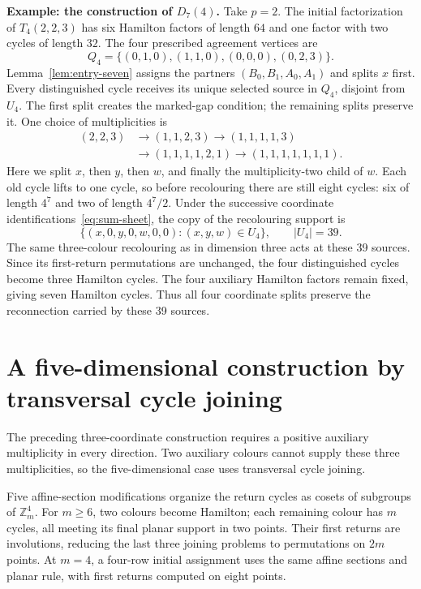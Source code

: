 \documentclass[11pt,reqno]{amsart}
\numberwithin{equation}{section}
\theoremstyle{definition}
\theoremstyle{remark}
\newcommand{\Zm}{\mathbb Z_m}
\begin{document}
\medskip
\noindent\textbf{Example: the construction of $D_7(4)$.}
Take $p=2$. The initial factorization of $T_4(2,2,3)$ has six Hamilton
factors of length $64$ and one factor with two cycles of length $32$.
The four prescribed agreement vertices are
\[
 Q_4=\{(0,1,0),(1,1,0),(0,0,0),(0,2,3)\}.
\]
Lemma~\ref{lem:entry-seven} assigns the partners $(B_0,B_1,A_0,A_1)$ and splits
$x$ first. Every distinguished cycle receives its unique selected source
in $Q_4$, disjoint from $U_4$. The first split creates the marked-gap
condition; the remaining splits preserve it. One choice of multiplicities is
\[
\begin{aligned}
 (2,2,3)&\longrightarrow(1,1,2,3)
          \longrightarrow(1,1,1,1,3)\\
        &\longrightarrow(1,1,1,1,2,1)
          \longrightarrow(1,1,1,1,1,1,1).
\end{aligned}
\]
Here we split $x$, then $y$, then $w$, and finally the multiplicity-two child
of $w$. Each old cycle lifts to one cycle, so before recolouring there are
still eight cycles: six of length $4^7$ and two of length $4^7/2$.
Under the successive coordinate identifications~\eqref{eq:sum-sheet}, the
copy of the recolouring support is
\[
 \{(x,0,y,0,w,0,0):(x,y,w)\in U_4\},\qquad |U_4|=39.
\]
The same three-colour recolouring as in dimension three acts at these
39 sources. Since its first-return permutations are unchanged, the four
distinguished cycles become three Hamilton cycles. The four auxiliary Hamilton factors remain fixed, giving seven
Hamilton cycles. Thus all four coordinate splits preserve the
reconnection carried by these 39 sources.

\section{A five-dimensional construction by transversal cycle joining}\label{sec:d5}
The preceding three-coordinate construction requires a positive
auxiliary multiplicity in every direction. Two auxiliary colours cannot
supply these three multiplicities, so the five-dimensional case uses
transversal cycle joining.

Five affine-section modifications organize the return cycles as cosets
of subgroups of $\Zm^4$. For $m\ge6$, two colours become Hamilton;
each remaining colour has $m$ cycles, all meeting its final planar
support in two points. Their first returns are involutions, reducing
the last three joining problems to permutations on $2m$ points.
At $m=4$, a four-row initial assignment uses the same affine sections
and planar rule, with first returns computed on eight points.
\end{document}
